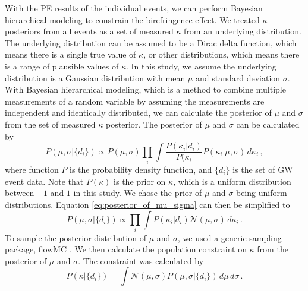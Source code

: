 \documentclass[aps,prd,twocolumn,superscriptaddress,preprintnumbers,floatfix,nofootinbib]{revtex4-2}
\begin{document}
With the PE results of the individual events, we can perform Bayesian hierarchical modeling to constrain the birefringence effect.
We treated $\kappa$ posteriors from all events as a set of measured $\kappa$ from an underlying distribution.
The underlying distribution can be assumed to be a Dirac delta function, which means there is a single true value of $\kappa$, or other distributions, which means there is a range of plausible values of $\kappa$.
In this study, we assume the underlying distribution is a Gaussian distribution with mean $\mu$ and standard deviation $\sigma$.
With Bayesian hierarchical modeling, which is a method to combine multiple measurements of a random variable by assuming the measurements are independent and identically distributed, we can calculate the posterior of $\mu$ and $\sigma$ from the set of measured $\kappa$ posterior.
The posterior of $\mu$ and $\sigma$ can be calculated by
\begin{equation}
    P(\mu,\sigma|\{d_i\})\propto P(\mu,\sigma)\prod_{i}\int\frac{P(\kappa_i|d_i)}{P(\kappa_i}P(\kappa_i|\mu,\sigma)\,d\kappa_i\,,
    \label{eq:posterior_of_mu_sigma}
\end{equation}
where function $P$ is the probability density function, and $\{d_i\}$ is the set of GW event data.
Note that $P(\kappa)$ is the prior on $\kappa$, which is a uniform distribution between $-1$ and $1$ in this study.
We chose the prior of $\mu$ and $\sigma$ being uniform distributions.
Equation \ref{eq:posterior_of_mu_sigma} can then be simplified to
\begin{equation}
    P(\mu,\sigma|\{d_i\})\propto\prod_{i}\int P(\kappa_i|d_i)\mathcal{N}(\mu,\sigma)\,d\kappa_i\,.
\end{equation}
To sample the posterior distribution of $\mu$ and $\sigma$, we used a generic sampling package, flowMC \citep{flowMC}.
We then calculate the population constraint on $\kappa$ from the posterior of $\mu$ and $\sigma$.
The constraint was calculated by
\begin{equation}
    P(\kappa|\{d_i\})=\int \mathcal{N}(\mu,\sigma)P(\mu,\sigma|\{d_i\})\,d\mu\,d\sigma\,.
\end{equation}
\end{document}
